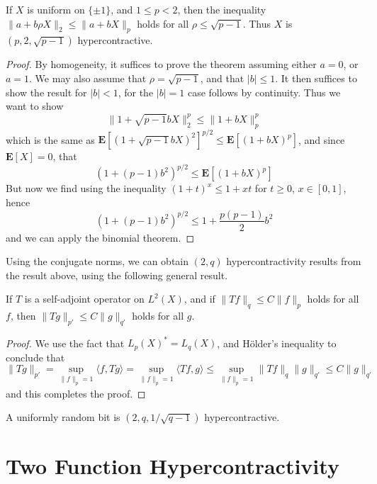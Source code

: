 \begin{theorem}[(p,2) hypercontractivity]
    If $X$ is uniform on $\{ \pm 1 \}$, and $1 \leq p < 2$, then the inequality $\| a + b \rho X \|_2 \leq \| a + bX \|_p$ holds for all $\rho \leq \sqrt{p-1}$. Thus $X$ is $(p,2,\sqrt{p-1})$ hypercontractive.
\end{theorem}
\begin{proof}
    By homogeneity, it suffices to prove the theorem assuming either $a = 0$, or $a = 1$. We may also assume that $\rho = \sqrt{p-1}$, and that $|b| \leq 1$. It then suffices to show the result for $|b| < 1$, for the $|b| = 1$ case follows by continuity. Thus we want to show
    \[ \| 1 + \sqrt{p-1} b X \|_2^p \leq \| 1 + bX \|_p^p \]
    which is the same as $\mathbf{E}[(1 + \sqrt{p-1} bX)^2]^{p/2} \leq \mathbf{E}[(1 + bX)^p]$, and since $\mathbf{E}[X] = 0$, that
    \[ (1 + (p-1) b^2)^{p/2} \leq \mathbf{E}[(1 + bX)^p] \]
    But now we find using the inequality $(1 + t)^x \leq 1 + xt$ for $t \geq 0$, $x \in [0,1]$, hence
    \[ (1 + (p-1)b^2)^{p/2} \leq 1 + \frac{p(p-1)}{2} b^2 \]
    and we can apply the binomial theorem.
\end{proof}

Using the conjugate norms, we can obtain $(2,q)$ hypercontractivity results from the result above, using the following general result.

\begin{theorem}
    If $T$ is a self-adjoint operator on $L^2(X)$, and if $\| Tf \|_q \leq C \| f \|_p$ holds for all $f$, then $\| Tg \|_{p'} \leq C \| g \|_{q'}$ holds for all $g$.
\end{theorem}
\begin{proof}
    We use the fact that $L_p(X)^* = L_q(X)$, and H\"{o}lder's inequality to conclude that
    \[ \| Tg \|_{p'} = \sup_{\| f \|_p = 1} \langle f, Tg \rangle = \sup_{\| f \|_p = 1} \langle Tf, g \rangle \leq \sup_{\| f \|_p = 1} \| Tf \|_q \| g \|_{q'} \leq C \| g \|_{q'} \]
    and this completes the proof.
\end{proof}

\begin{corollary}
    A uniformly random bit is $(2,q,1/\sqrt{q-1})$ hypercontractive.
\end{corollary}

\section{Two Function Hypercontractivity}


